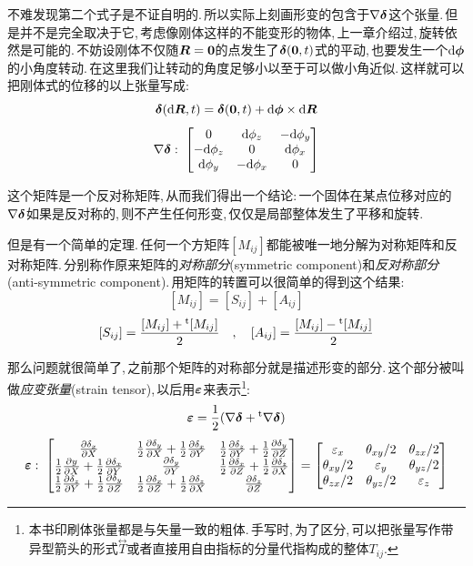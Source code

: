 不难发现第二个式子是不证自明的.\,所以实际上刻画形变的包含于$\nabla\boldsymbol{\delta}$这个张量.\,但是并不是完全取决于它,\,考虑像刚体这样的不能变形的物体,\,上一章介绍过,\,旋转依然是可能的.\,不妨设刚体不仅随$\boldsymbol{R}=\boldsymbol{0}$的点发生了$\boldsymbol{\delta}(\boldsymbol{0},t)$式的平动,\,也要发生一个$\textrm{d}\boldsymbol{\phi}$的小角度转动.\,在这里我们让转动的角度足够小以至于可以做小角近似.\,这样就可以把刚体式的位移的以上张量写成:
\[\boldsymbol{\delta}(\textrm{d} \boldsymbol{R},t)=\boldsymbol{\delta}(\boldsymbol{0},t)+\textrm{d} \boldsymbol{\phi}\times \textrm{d} \boldsymbol{R}\]
\[\nabla\boldsymbol{\delta}:\; \begin{bmatrix} 0&\textrm{d} \phi_z &-\textrm{d} \phi_y \\-\textrm{d} \phi_z&0&\textrm{d} \phi_x \\ \textrm{d} \phi_y &-\textrm{d} \phi_x &0\end{bmatrix}\]

这个矩阵是一个反对称矩阵,\,从而我们得出一个结论:\,一个固体在某点位移对应的$\nabla\boldsymbol{\delta}$如果是反对称的,\,则不产生任何形变,\,仅仅是局部整体发生了平移和旋转.

但是有一个简单的定理.\,任何一个方矩阵$[M_{ij}]$都能被唯一地分解为对称矩阵和反对称矩阵.\,分别称作原来矩阵的\emph{对称部分}(symmetric component)和\emph{反对称部分}(anti-symmetric component).\,用矩阵的转置可以很简单的得到这个结果:
\[[M_{ij}]=[S_{ij}]+[A_{ij}]\]
\[[S_{ij}]=\frac{[M_{ij}]+\phantom{}^{\rm t}[M_{ij}]}{2}\quad,\quad [A_{ij}]=\frac{[M_{ij}]-\phantom{}^{\rm t}[M_{ij}]}{2}\]

那么问题就很简单了,\,之前那个矩阵的对称部分就是描述形变的部分.\,这个部分被叫做\emph{应变张量}(strain tensor),\,以后用$\boldsymbol{\varepsilon}$来表示\footnote{本书印刷体张量都是与矢量一致的粗体.\,手写时,\,为了区分,\,可以把张量写作带异型箭头的形式$\stackrel{\leftrightarrow}{T}$或者直接用自由指标的分量代指构成的整体$T_{ij}$.}:
\[\boldsymbol{\varepsilon}=\frac{1}{2}(\nabla\boldsymbol{\delta}+\phantom{}^{\rm t}\nabla\boldsymbol{\delta})\]
\[\boldsymbol{\varepsilon}:\; \begin{bmatrix}\frac{\partial \delta_x}{\partial X}&\frac{1}{2}\frac{\partial \delta_y}{\partial X}+\frac{1}{2}\frac{\partial \delta_x}{\partial Y}&\frac{1}{2}\frac{\partial \delta_z}{\partial Y}+\frac{1}{2}\frac{\partial \delta_y}{\partial Z}\\\frac{1}{2}\frac{\partial y}{\partial X}+\frac{1}{2}\frac{\partial \delta_x}{\partial Y}&\frac{\partial \delta_y}{\partial Y}&\frac{1}{2}\frac{\partial \delta_x}{\partial Z}+\frac{1}{2}\frac{\partial \delta_z}{\partial X}\\\frac{1}{2}\frac{\partial \delta_z}{\partial Y}+\frac{1}{2}\frac{\partial \delta_y}{\partial Z}&\frac{1}{2}\frac{\partial \delta_x}{\partial Z}+\frac{1}{2}\frac{\partial \delta_z}{\partial X}&\frac{\partial \delta_z}{\partial Z}\end{bmatrix}=\begin{bmatrix} \varepsilon_x&\theta_{xy}/2 &\theta_{zx}/2 \\ \theta_{xy}/2&\varepsilon_y&\theta_{yz}/2 \\ \theta_{zx}/2&\theta_{yz}/2&\varepsilon_z\end{bmatrix}\]

